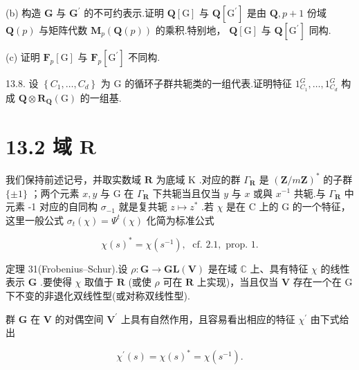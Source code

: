\documentclass[10pt]{article}
\begin{document}
(b) 构造 \(\mathbf{G}\) 与 \({\mathbf{G}}^{\prime }\) 的不可约表示.证明 \(\mathbf{Q}\left\lbrack  \mathrm{G}\right\rbrack\) 与 \(\mathbf{Q}\left\lbrack  {\mathrm{G}}^{\prime }\right\rbrack\) 是由 \(\mathbf{Q},p + 1\) 份域 \(\mathbf{Q}\left( p\right)\) 与矩阵代数 \({\mathbf{M}}_{p}\left( {\mathbf{Q}\left( p\right) }\right)\) 的乘积.特别地， \(\mathbf{Q}\left\lbrack  \mathrm{G}\right\rbrack\) 与 \(\mathbf{Q}\left\lbrack  {\mathrm{G}}^{\prime }\right\rbrack\) 同构.

(c) 证明 \({\mathbf{F}}_{p}\left\lbrack  \mathrm{G}\right\rbrack\) 与 \({\mathbf{F}}_{p}\left\lbrack  {\mathrm{G}}^{\prime }\right\rbrack\) 不同构.

13.8. 设 \(\left\{  {{C}_{1},\ldots ,{C}_{d}}\right\}\) 为 G 的循环子群共轭类的一组代表.证明特征 \({1}_{{C}_{1}}^{G},\ldots ,{1}_{{C}_{d}}^{G}\) 构成 \(\mathbf{Q} \otimes  {\mathbf{R}}_{\mathbf{Q}}\left( \mathrm{G}\right)\) 的一组基.

\section*{13.2 域 \(\mathbf{R}\)}

我们保持前述记号，并取实数域 \(\mathbf{R}\) 为底域 \(\mathrm{K}\) .对应的群 \({\Gamma }_{\mathbf{R}}\) 是 \({\left( \mathbf{Z}/m\mathbf{Z}\right) }^{ * }\) 的子群 \(\{  \pm  1\}\) ；两个元素 \(x,y\) 与 \(\mathrm{G}\) 在 \({\Gamma }_{\mathbf{R}}\) 下共轭当且仅当 \(y\) 与 \(x\) 或與 \({x}^{-1}\) 共轭.与 \({\Gamma }_{\mathbf{R}}\) 中元素 -1 对应的自同构 \({\sigma }_{-1}\) 就是复共轭 \(z \mapsto  {z}^{ * }\) .若 \(\chi\) 是在 \(\mathrm{C}\) 上的 G 的一个特征，这里一般公式 \({\sigma }_{t}\left( \chi \right)  = {\Psi }^{t}\left( \chi \right)\) 化简为标准公式

\[
\chi {\left( s\right) }^{ * } = \chi \left( {s}^{-1}\right) ,\;\text{ cf. }{2.1},\text{ prop. }1.
\]

定理 31(Frobenius–Schur).设 \(\rho  : \mathbf{G} \rightarrow  \mathbf{{GL}}\left( \mathbf{V}\right)\) 是在域 \(\mathbb{C}\) 上、具有特征 \(\chi\) 的线性表示 \(\mathbf{G}\) .要使得 \(\chi\) 取值于 \(\mathbf{R}\) (或使 \(\rho\) 可在 \(\mathbf{R}\) 上实现)，当且仅当 \(\mathbf{V}\) 存在一个在 G 下不变的非退化双线性型(或对称双线性型).

群 \(\mathbf{G}\) 在 \(\mathbf{V}\) 的对偶空间 \({\mathbf{V}}^{\prime }\) 上具有自然作用，且容易看出相应的特征 \({\chi }^{\prime }\) 由下式给出

\[
{\chi }^{\prime }\left( s\right)  = \chi {\left( s\right) }^{ * } = \chi \left( {s}^{-1}\right) .
\]
\end{document}
